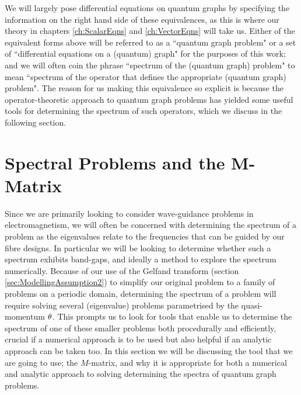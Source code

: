 We will largely pose differential equations on quantum graphs by specifying the information on the right hand side of these equivalences, as this is where our theory in chapters \ref{ch:ScalarEqns} and \ref{ch:VectorEqns} will take us.
Either of the equivalent forms above will be referred to as a ``quantum graph problem" or a set of ``differential equations on a (quantum) graph" for the purposes of this work; and we will often coin the phrase ``spectrum of the (quantum graph) problem" to mean ``spectrum of the operator that defines the appropriate (quantum graph) problem".
The reason for us making this equivalence so explicit is because the operator-theoretic approach to quantum graph problems has yielded some useful tools for determining the spectrum of such operators, which we discuss in the following section.

\section{Spectral Problems and the M-Matrix} \label{sec:M-MatrixTheory}
Since we are primarily looking to consider wave-guidance problems in electromagnetism, we will often be concerned with determining the spectrum of a problem as the eigenvalues relate to the frequencies that can be guided by our fibre designs.
In particular we will be looking to determine whether such a spectrum exhibits band-gaps, and ideally a method to explore the spectrum numerically.
Because of our use of the Gelfand transform (section \ref{sec:ModellingAssumption2}) to simplify our original problem to a family of problems on a periodic domain, determining the spectrum of a problem will require solving several (eigenvalue) problems parametrised by the quasi-momentum $\theta$.
This prompts us to look for tools that enable us to determine the spectrum of one of these smaller problems both procedurally and efficiently, crucial if a numerical approach is to be used but also helpful if an analytic approach can be taken too.
In this section we will be discussing the tool that we are going to use; the $M$-matrix, and why it is appropriate for both a numerical and analytic approach to solving determining the spectra of quantum graph problems. \newline

